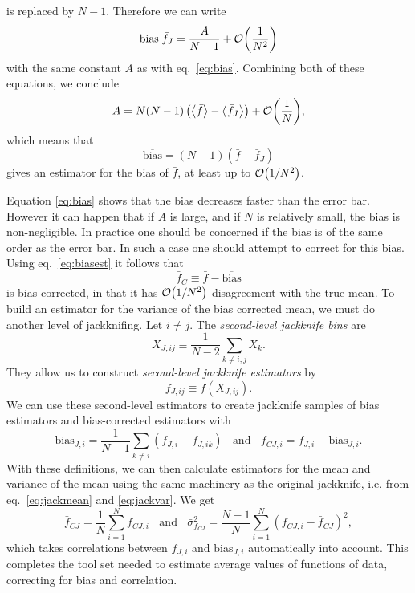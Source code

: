 is replaced by $N-1$. Therefore we can write
\begin{equation}
  \text{bias}\;\bar{f}_J=\frac{A}{N-1}+\order{\frac{1}{N^2}}
\end{equation}
with the same constant $A$ as with eq.~\eqref{eq:bias}. Combining both
of these equations, we conclude
\begin{equation}
  A=N(N-1)\left(\ev{\bar{f}}-\ev{\bar{f}_J}\right)
     +\order{\frac{1}{N}},
\end{equation}
which means that
\begin{equation}\label{eq:biasest}
  \overline{\text{bias}}=(N-1)(\bar{f}-\bar{f}_J)
\end{equation}
gives an estimator for the bias of $\bar{f}$, at least up to 
$\order{1/N^2}$.

Equation \eqref{eq:bias} shows that the bias decreases faster than the
error bar. However it can happen that if $A$ is large, and if $N$ is
relatively small, the bias is non-negligible. In practice one should
be concerned if the bias is of the same order as the error bar. In such
a case one should attempt to correct for this bias. Using 
eq.~\eqref{eq:biasest} it follows that
\begin{equation}
  \bar{f}_C\equiv \bar{f}-\overline{\text{bias}}
\end{equation}
is bias-corrected, in that it has $\order{1/N^2}$ disagreement
with the true mean. To build an estimator for the variance of the
bias corrected mean, we must do another level of jackknifing.
Let $i\neq j$. The {\it second-level jackknife bins} 
 are
\begin{equation}
  X_{J,ij}\equiv\frac{1}{N-2}\sum_{k\neq i,j}X_k.
\end{equation}
They allow us to construct {\it second-level jackknife estimators} by
\begin{equation}
  f_{J,ij}\equiv f(X_{J,ij}).
\end{equation}
We can use these second-level estimators to create jackknife samples of
bias estimators and bias-corrected estimators with
\begin{equation}
  \text{bias}_{J,i}=
   \frac{1}{N-1}\sum_{k\neq i}(f_{J,i}-f_{J,ik})~~~~\text{and}~~~~
    f_{CJ,i}=f_{J,i}-\text{bias}_{J,i}.
\end{equation}
With these definitions, we can then calculate estimators for the mean
and variance of the mean using the same machinery as the original
jackknife, i.e. from eq.~\eqref{eq:jackmean} and \eqref{eq:jackvar}.
We get
\begin{equation}
  \bar{f}_{CJ}=\frac{1}{N}\sum_{i=1}^N f_{CJ,i}~~~~\text{and}~~~~
   \bar\sigma_{f_{CJ}}^2
    =\frac{N-1}{N}\sum_{i=1}^N(f_{CJ,i}-\bar{f}_{CJ})^2,
\end{equation}
which takes correlations between $f_{J,i}$ and $\text{bias}_{J,i}$
automatically into account. This completes the tool set needed to
estimate average values of functions of data, correcting for bias and
correlation.

